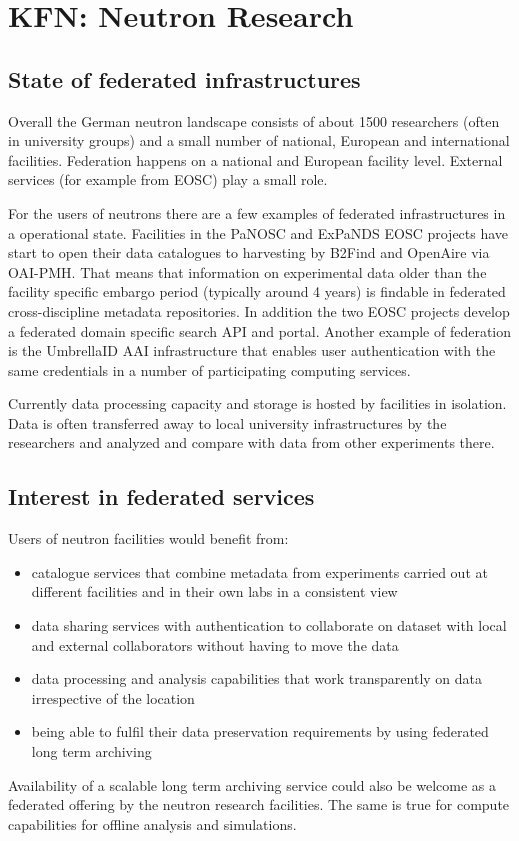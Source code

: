 \section{KFN: Neutron Research}


\subsection{State of federated infrastructures}

Overall the German neutron landscape consists of about 1500 researchers
(often in university groups) and a small number of national, European
and international facilities. Federation happens on a national and
European facility level. External services (for example from EOSC)
play a small role.

For the users of neutrons there are a few examples of federated
infrastructures in a operational state.  Facilities in the PaNOSC
and ExPaNDS EOSC projects have start to open their data catalogues
to harvesting by B2Find and OpenAire via OAI-PMH. That means that
information on experimental data older than the facility specific
embargo period (typically around 4 years) is findable in federated
cross-discipline metadata repositories.  In addition the two EOSC
projects develop a federated domain specific search API and portal.
Another example of federation is the UmbrellaID AAI infrastructure
that enables user authentication with the same credentials in a
number of participating computing services.

Currently data processing capacity and storage is hosted by facilities
in isolation. Data is often transferred away to local university
infrastructures by the researchers and analyzed and compare with
data from other experiments there.

\subsection{Interest in federated services}

Users of neutron facilities would benefit from:

\begin{itemize}
   \item catalogue services that combine metadata from experiments
         carried out at different facilities and in their own labs
         in a consistent view
   \item data sharing services with authentication to collaborate
         on dataset with local and external collaborators without
         having to move the data
   \item data processing and analysis capabilities that work
         transparently on data irrespective of the location
   \item being able to fulfil their data preservation requirements
         by using federated long term archiving
\end{itemize}

Availability of a scalable long term archiving service could also
be welcome as a federated offering by the neutron research facilities.
The same is true for compute capabilities for offline analysis and
simulations.
